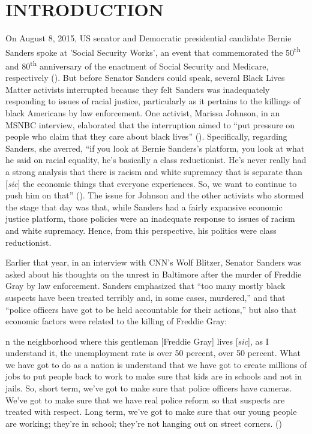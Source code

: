 \documentclass[12pt]{article}
\renewenvironment{quote}
  {\list{}{\leftmargin=\parindent\rightmargin=0pt}%
   \item\relax}
  {\endlist}
\begin{document}

\section{INTRODUCTION}

On August 8, 2015, US senator and Democratic presidential candidate Bernie Sanders spoke at 'Social Security Works', an event that commemorated the 50\textsuperscript{th} and 80\textsuperscript{th} anniversary of the enactment of Social Security and Medicare, respectively (\cite{wilsonProtestersShutBernie2015}). But before Senator Sanders could speak, several Black Lives Matter activists interrupted because they felt Sanders was inadequately responding to issues of racial justice, particularly as it pertains to the killings of black Americans by law enforcement. One activist, Marissa Johnson, in an MSNBC interview, elaborated that the interruption aimed to “put pressure on people who claim that they care about black lives” (\cite{hallBernieSandersBlack2015}). Specifically, regarding Sanders, she averred, “if you look at Bernie Sanders’s platform, you look at what he said on racial equality, he’s basically a class reductionist. He’s never really had a strong analysis that there is racism and white supremacy that is separate than [\textit{sic}] the economic things that everyone experiences. So, we want to continue to push him on that” (\cite{hallBernieSandersBlack2015}). The issue for Johnson and the other activists who stormed the stage that day was that, while Sanders had a fairly expansive economic justice platform, those policies were an inadequate response to issues of racism and white supremacy. Hence, from this perspective, his politics were class reductionist.

Earlier that year, in an interview with CNN’s Wolf Blitzer, Senator Sanders was asked about his thoughts on the unrest in Baltimore after the murder of Freddie Gray by law enforcement. Sanders emphasized that “too many mostly black suspects have been treated terribly and, in some cases, murdered,” and that “police officers have got to be held accountable for their actions,” but also that economic factors were related to the killing of Freddie Gray:

\begin{quote}
[I]n the neighborhood where this gentleman [Freddie Gray] lives [\textit{sic}], as I understand it, the unemployment rate is over 50 percent, over 50 percent. What we have got to do as a nation is understand that we have got to create millions of jobs to put people back to work to make sure that kids are in schools and not in jails. So, short term, we've got to make sure that police officers have cameras. We've got to make sure that we have real police reform so that suspects are treated with respect. Long term, we've got to make sure that our young people are working; they're in school; they're not hanging out on street corners. (\cite{sandersInterviewWolfBlitzer2015})
\end{quote}
\end{document}
